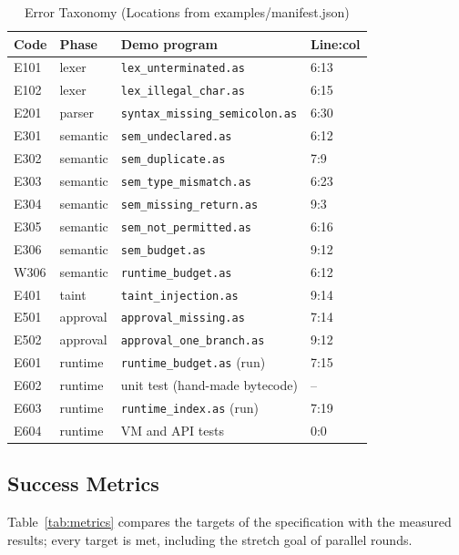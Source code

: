 \documentclass[conference]{IEEEtran}
\begin{document}
\begin{table}[!htb]
\caption{Error Taxonomy (Locations from examples/manifest.json)}
\label{tab:errors}
\centering
\footnotesize
\setlength{\tabcolsep}{3pt}
\renewcommand{\arraystretch}{1.1}
\begin{tabular}{P{0.365in}P{0.565in}P{1.715in}P{0.515in}}
\hline
\textbf{Code} & \textbf{Phase} & \textbf{Demo program} & \textbf{Line:col} \\
\hline
E101 & lexer & \texttt{lex\_unterminated.as} & 6:13 \\
E102 & lexer & \texttt{lex\_illegal\_char.as} & 6:15 \\
E201 & parser & \texttt{syntax\_missing\_semicolon.as} & 6:30 \\
E301 & semantic & \texttt{sem\_undeclared.as} & 6:12 \\
E302 & semantic & \texttt{sem\_duplicate.as} & 7:9 \\
E303 & semantic & \texttt{sem\_type\_mismatch.as} & 6:23 \\
E304 & semantic & \texttt{sem\_missing\_return.as} & 9:3 \\
E305 & semantic & \texttt{sem\_not\_permitted.as} & 6:16 \\
E306 & semantic & \texttt{sem\_budget.as} & 9:12 \\
W306 & semantic & \texttt{runtime\_budget.as} & 6:12 \\
E401 & taint & \texttt{taint\_injection.as} & 9:14 \\
E501 & approval & \texttt{approval\_missing.as} & 7:14 \\
E502 & approval & \texttt{approval\_one\_branch.as} & 9:12 \\
E601 & runtime & \texttt{runtime\_budget.as} (run) & 7:15 \\
E602 & runtime & unit test (hand-made bytecode) & -- \\
E603 & runtime & \texttt{runtime\_index.as} (run) & 7:19 \\
E604 & runtime & VM and API tests & 0:0 \\
\hline
\end{tabular}
\end{table}
\subsection{Success Metrics}
Table~\ref{tab:metrics} compares the targets of the specification with the measured results; every target is met, including the stretch goal of parallel rounds.
\end{document}
